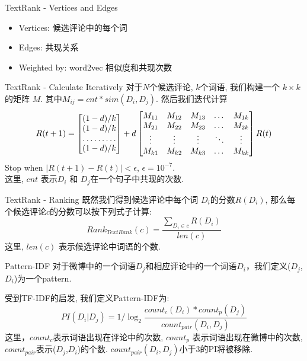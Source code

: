 \documentclass[aspectratio=169]{beamer}
\begin{document}
    \begin{frame}{TextRank - Vertices and Edges}
      \begin{itemize}
        \item Vertices: 候选评论中的每个词
        \item Edges: 共现关系
        \item Weighted by: word2vec 相似度和共现次数
      \end{itemize}
    \end{frame}

    \begin{frame}{TextRank - Calculate Iteratively}
      对于$N$个候选评论, $k$个词语, 我们构建一个 $ k \times k $ 的矩阵 $M$. 其中$M_{ij} = cnt * sim(D_i, D_j)$. 然后我们迭代计算
      \[
      R(t+1) = 
      \begin{bmatrix}
          (1-d)/k       \\
          (1-d)/k       \\
          \hdotsfor{1} \\
          (1-d)/k       
      \end{bmatrix}
      +d
      \begin{bmatrix}
          M_{11} & M_{12} & M_{13} & \dots  & M_{1k} \\
          M_{21} & M_{22} & M_{23} & \dots  & M_{2k} \\
          \vdots & \vdots & \vdots & \ddots & \vdots \\
          M_{k1} & M_{k2} & M_{k3} & \dots  & M_{kk}
      \end{bmatrix}
      R(t)
      \]
      Stop when $|R(t+1)-R(t)|<\epsilon$, $\epsilon = 10^{-7}$. \\
      这里, $cnt$ 表示$D_i$ 和 $D_j$在一个句子中共现的次数. \\
    \end{frame}

    \begin{frame}{TextRank - Ranking}
      既然我们得到候选评论中每个词 $D_i$的分数$R(D_i)$, 那么每个候选评论$c$的分数可以按下列式子计算:
      \begin{equation}
        Rank_{TextRank}(c) = \frac{\sum_{D_i \in c}{R(D_i)}}{len(c)} 
      \end{equation}
      这里, $len(c)$ 表示候选评论中词语的个数.
    \end{frame}

    \begin{frame}{Pattern-IDF}
      对于微博中的一个词语$D_j$和相应评论中的一个词语$D_i$，我们定义($D_j$,$D_i$)为一个pattern.

      受到TF-IDF的启发, 我们定义Pattern-IDF为:
      \begin{equation}
        PI(D_i|D_j) = 1 / \log_2{\frac{count_c(D_i) * count_p(D_j)}{count_{pair}(D_i, D_j)}}
      \end{equation}
      这里，$count_c$表示词语出现在评论中的次数, $count_p$ 表示词语出现在微博中的次数, $count_{pair}$表示($D_j$,$D_i$)的个数. $count_{pair}(D_i, D_j)$小于3的PI将被移除.

    \end{frame}
\end{document}
